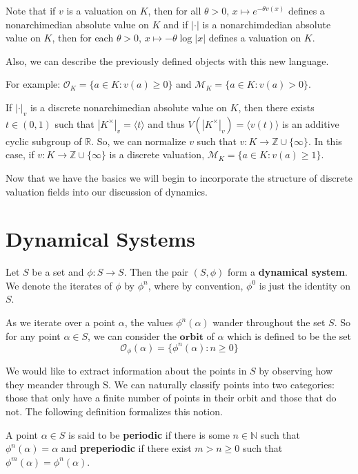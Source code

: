 \documentclass{amsart}
\newcommand{\MCM}{\mathcal{M}}
\newcommand{\MCO}{\mathcal{O}}
\begin{document}
Note that if $v$ is a valuation on $K$, then for all $\theta >0$, $x \mapsto e^{-\theta v(x)}$ defines a nonarchimedian absolute value on $K$  and if $|\cdot |$ is a nonarchimdedian absolute value on $K$, then for each $\theta >0$, $x \mapsto -\theta \log |x|$ defines a valuation on $K$. 

Also, we can describe the previously defined objects with this new language. 

For example: $\MCO_K=\{a \in K : v(a)\geq 0\}$ and $\MCM_K=\{a \in K : v(a) > 0\}$. 

If $|\cdot|_v$ is a discrete nonarchimedian absolute value on $K$, then there exists $t \in (0,1)$ such that $|K^{\times}|_v=\langle t \rangle$ and thus $V(|K^{\times}|_v)= \langle v(t) \rangle$ is an additive cyclic subgroup of $\mathbb{R}$.   So, we can normalize $v$ such that $v: K \rightarrow \mathbb{Z} \cup \{\infty\}$.
In this case, if $v: K \rightarrow \mathbb{Z} \cup \{\infty \}$ is a discrete valuation, 
$\MCM_K=\{a \in K : v(a) \geq 1\}$.

Now that we have the basics we will begin to incorporate the structure of discrete valuation fields into our discussion of dynamics. 

\section{Dynamical Systems}

Let $S$ be a set and $\phi: S \to S$. Then the pair $(S,\phi)$ form a \textbf{dynamical system}. We denote the iterates of $\phi$ by $\phi^{n}$, where by convention, $\phi^{0}$ is just the identity on $S$. 

As we iterate over a point $\alpha$, the values $\phi^{n}(\alpha)$ wander throughout the set $S$. So for any point $\alpha \in S$, we can consider the $\textbf{orbit}$ of $\alpha$ which is defined to be the set \begin{equation}
\mathcal{O}_{\phi}(\alpha) = \{\phi^{n}(\alpha): n \geq 0\}
\end{equation}

\noindent We would like to extract information about the points in $S$ by observing how they meander through S. We can naturally classify points into two categories: those that only have a finite number of points in their orbit and those that do not. The following definition formalizes this notion.

A point $\alpha \in S$ is said to be \textbf{periodic} if there is some $n \in \mathbb{N}$ such that $\phi^{n}(\alpha) = \alpha$ and \textbf{preperiodic} if there exist $m > n \geq 0$ such that $\phi^{m}(\alpha) = \phi^{n}(\alpha)$.
\end{document}

